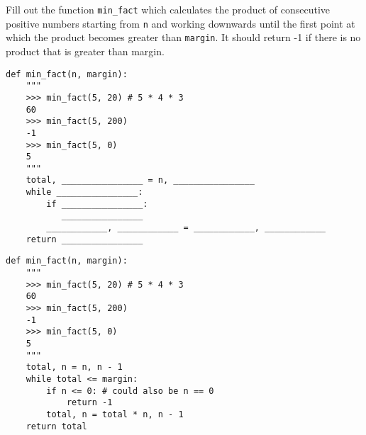 \question Fill out the function \lstinline{min_fact} which calculates the product of consecutive positive numbers starting from \lstinline{n} and working downwards until the first point at which the product becomes greater than \lstinline{margin}. It should return -1 if there is no product that is greater than margin.

\begin{blocksection}
\begin{lstlisting}
def min_fact(n, margin):
    """
    >>> min_fact(5, 20) # 5 * 4 * 3
    60
    >>> min_fact(5, 200)
    -1
    >>> min_fact(5, 0)
    5
    """
    total, ________________ = n, ________________
    while ________________:
        if ________________:
           ________________
        ____________, ____________ = ____________, ____________
    return ________________

\end{lstlisting}
\end{blocksection}

\begin{blocksection}
\begin{solution}
\begin{lstlisting}
def min_fact(n, margin):
    """
    >>> min_fact(5, 20) # 5 * 4 * 3
    60
    >>> min_fact(5, 200)
    -1
    >>> min_fact(5, 0)
    5
    """
    total, n = n, n - 1
    while total <= margin:
        if n <= 0: # could also be n == 0
            return -1
        total, n = total * n, n - 1
    return total
\end{lstlisting}
\end{solution}
\end{blocksection}